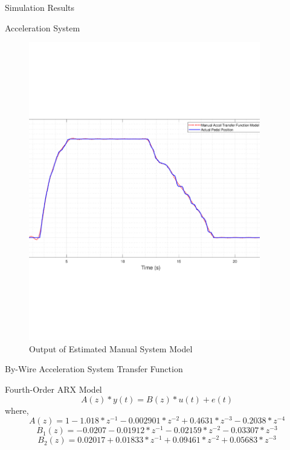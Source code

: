 \documentclass{beamer}
\begin{document}
\begin{frame}{Simulation Results}
\begin{block}{Acceleration System}
\begin{figure}
\begin{minipage}{0.45\textwidth}
        \includegraphics[width=0.9\textwidth]{figs/img/manualAccelTransferFunctionModel} %
        \caption{Output of Estimated Manual System Model}
        \label{fig:manualAccelModel}
    \end{minipage}
\end{figure}
  \end{block}
\end{frame}

\begin{frame}{By-Wire Acceleration System Transfer Function}
	\begin{block}{Fourth-Order ARX Model}
		\begin{equation}
			A(z)*y(t) = B(z)*u(t) + e(t)
		\end{equation}
		where, 
		\begin{equation}
			A(z) = 1 - 1.018*z^{-1} - 0.002901*z^{-2} + 0.4631*z^{-3} - 0.2038*z^{-4}
		\end{equation}
		\begin{equation}
			B_1(z) = -0.0207 - 0.01912*z^{-1} - 0.02159*z^{-2} - 0.03307*z^{-3}
		\end{equation}
		\begin{equation}
			B_2(z) = 0.02017 + 0.01833*z^{-1} + 0.09461*z^{-2} + 0.05683*z^{-3}
		\end{equation}
	\end{block}
\end{frame}
\end{document}
